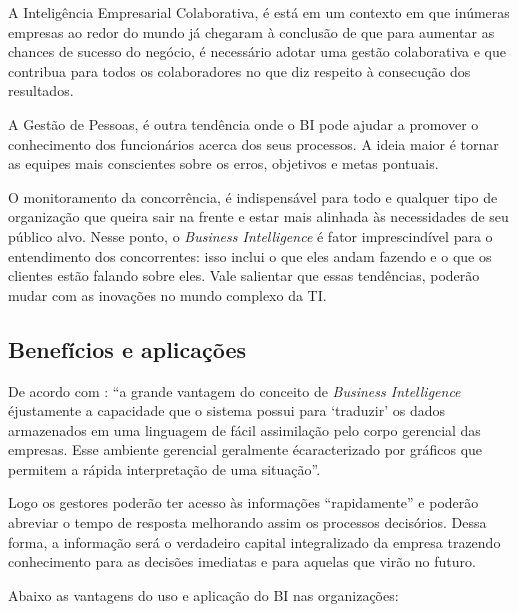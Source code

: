 A Intelig\^{e}ncia Empresarial Colaborativa, \'{e} est\'{a} em um contexto em que inúmeras empresas ao redor do mundo j\'{a} chegaram \`{a} conclus\~{a}o de que para aumentar as chances de sucesso do neg\'{o}cio, \'{e} necess\'{a}rio adotar uma gest\~{a}o colaborativa e que contribua para todos os colaboradores no que diz respeito \`{a} consecu\c{c}\~{a}o dos resultados.

A Gest\~{a}o de Pessoas, \'{e} outra tend\^{e}ncia onde o BI pode ajudar a promover o conhecimento dos funcion\'{a}rios acerca dos seus processos. A ideia maior \'{e} tornar as equipes mais conscientes sobre os erros, objetivos e metas pontuais.

O monitoramento da concorr\^{e}ncia, \'{e} indispens\'{a}vel para todo e qualquer tipo de organiza\c{c}\~{a}o que queira sair na frente e estar mais alinhada \`{a}s necessidades de seu  público alvo. Nesse ponto, o \textit{Business Intelligence} \'{e} fator imprescind\'{i}vel para o entendimento dos concorrentes: isso inclui o que eles andam fazendo e o que os clientes est\~{a}o falando sobre eles.
Vale salientar que essas tend\^{e}ncias, poder\~{a}o mudar com as inova\c{c}\~{o}es no mundo complexo da TI.

\subsection{Benef\'{i}cios e aplica\c{c}\~{o}es}

De acordo com \cite{noronha-2013} : “a grande vantagem do conceito de \textit{Business Intelligence} \'{e}justamente a capacidade que o sistema possui para ‘traduzir’ os dados armazenados em uma linguagem de f\'{a}cil assimila\c{c}\~{a}o pelo corpo gerencial das empresas. Esse ambiente gerencial geralmente \'{e}caracterizado por gr\'{a}ficos que permitem a r\'{a}pida interpreta\c{c}\~{a}o de uma situa\c{c}\~{a}o”.

Logo os gestores poder\~{a}o ter acesso \`{a}s informa\c{c}\~{o}es “rapidamente” e poder\~{a}o abreviar o tempo de resposta melhorando assim os processos decis\'{o}rios. Dessa forma, a informa\c{c}\~{a}o ser\'{a} o verdadeiro capital integralizado da empresa trazendo conhecimento para as decis\~{o}es imediatas e para aquelas que vir\~{a}o no futuro.

Abaixo as vantagens do uso e aplica\c{c}\~{a}o do BI nas organiza\c{c}\~{o}es:


